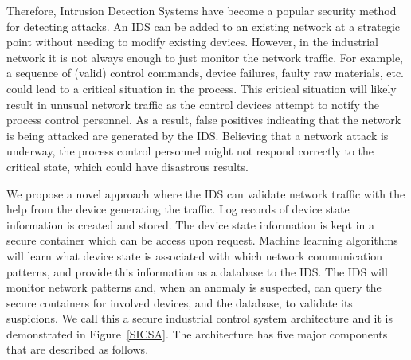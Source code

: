 \documentclass[conference]{IEEEtran}
\begin{document}
Therefore, Intrusion Detection Systems have become a popular security method for detecting attacks.  An IDS can be added to an existing network at a strategic point without needing to modify existing devices.
However, in the industrial network it is not always enough to just monitor the network traffic. For example, a sequence of (valid) control commands, device failures, faulty raw materials, etc. could lead to a critical situation in the process.  This critical situation will likely result in unusual network traffic as the control devices attempt to notify the process control personnel.   As a result, false positives indicating that the network is being attacked are generated by the IDS.  Believing that a network attack is underway, the process control personnel might not respond correctly to the critical state, which could have disastrous results. 

We propose a novel approach where the IDS can validate network traffic with the help from the device generating the traffic.  Log records of device state information is created and stored. The device state information is kept in a secure container which can be access upon request. Machine learning algorithms will learn what device state is associated with which network communication patterns, and provide this information as a database to the IDS. The IDS will monitor network patterns and, when an anomaly is suspected, can query the secure containers for involved devices, and the database, to validate its suspicions. We call this a secure industrial control system architecture and it is demonstrated in Figure~\ref{SICSA}. 
The architecture has five major components that are described as follows.

\end{document}
